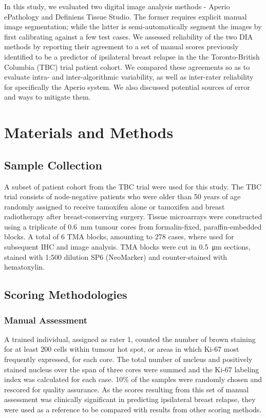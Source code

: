 \documentclass[final,5p,times,twocolumn]{elsarticle}
\begin{document}
In this study, we evaluated two digital image analysis methods - Aperio ePathology and Definiens Tissue Studio. The former requires explicit manual image segmentation; while the latter is semi-automatically segment the images by first calibrating against a few test cases. We assessed reliability of the two DIA methods by reporting their agreement to a set of manual scores previously identified to be a predictor of ipsilateral breast relapse in the the Toronto-British Columbia (TBC) trial patient cohort. \cite{Liu2015} We compared these agreements so as to evaluate intra- and inter-algorithmic variability, as well as inter-rater reliability for specifically the Aperio system. We also discussed potential sources of error and ways to mitigate them.

\section*{Materials and Methods}

\subsection*{Sample Collection}
A subset of patient cohort from the TBC trial were used for this study. \cite{Liu2015} The TBC trial consists of node-negative patients who were older than 50 years of age randomly assigned to receive tamoxifen alone or tamoxifen and breast radiotherapy after breast-conserving surgery. \cite{Fyles2009} Tissue microarrays were constructed using a triplicate of \SI{0.6}{\milli\metre} tumour cores from formalin-fixed, paraffin-embedded blocks. A total of 6 TMA blocks, amounting to 278 cases, where used for subsequent IHC and image analysis. TMA blocks were cut in \SI{0.5}{\micro\metre} sections, stained with 1:500 dilution SP6 (NeoMarker) and counter-stained with hematoxylin.

\subsection*{Scoring Methodologies}

\subsubsection*{Manual Assessment}
A trained individual, assigned as rater 1, counted the number of brown staining for at least 200 cells within tumour hot spot, or areas in which Ki-67 most frequently expressed, for each core. The total number of nucleus and positively stained nucleus over the span of three cores were summed and the Ki-67 labeling index was calculated for each case. 10\% of the samples were randomly chosen and rescored for quality assurance. As the scores resulting from this set of manual assessment was clinically significant in predicting ipsilateral breast relapse, they were used as a reference to be compared with results from other scoring methods.
\end{document}
